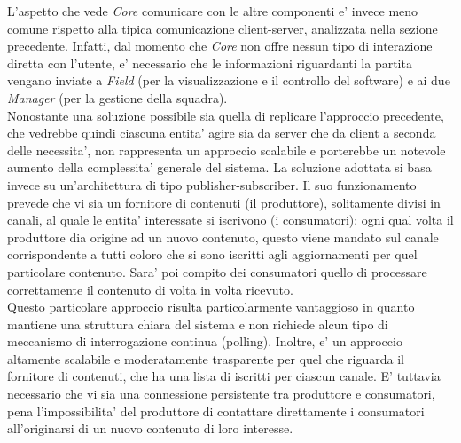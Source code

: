 L'aspetto che vede \textit{Core} comunicare con le altre componenti e' invece meno comune rispetto alla tipica comunicazione client-server, analizzata nella sezione precedente. Infatti, dal momento che \textit{Core} non offre nessun tipo di interazione diretta con l'utente, e' necessario che le informazioni riguardanti la partita vengano inviate a \textit{Field} (per la visualizzazione e il controllo del software) e ai due \textit{Manager} (per la gestione della squadra).\\

Nonostante una soluzione possibile sia quella di replicare l'approccio precedente, che vedrebbe quindi ciascuna entita' agire sia da server che da client a seconda delle necessita', non rappresenta un approccio scalabile e porterebbe un notevole aumento della complessita' generale del sistema. La soluzione adottata si basa invece su un'architettura di tipo publisher-subscriber. Il suo funzionamento prevede che vi sia un fornitore di contenuti (il produttore), solitamente divisi in canali, al quale le entita' interessate si iscrivono (i consumatori): ogni qual volta il produttore dia origine ad un nuovo contenuto, questo viene mandato sul canale corrispondente a tutti coloro che si sono iscritti agli aggiornamenti per quel particolare contenuto. Sara' poi compito dei consumatori quello di processare correttamente il contenuto di volta in volta ricevuto.\\

Questo particolare approccio risulta particolarmente vantaggioso in quanto mantiene una struttura chiara del sistema e non richiede alcun tipo di meccanismo di interrogazione continua (polling). Inoltre, e' un approccio altamente scalabile e moderatamente trasparente per quel che riguarda il fornitore di contenuti, che ha una lista di iscritti per ciascun canale. E' tuttavia necessario che vi sia una connessione persistente tra produttore e consumatori, pena l'impossibilita' del produttore di contattare direttamente i consumatori all'originarsi di un nuovo contenuto di loro interesse.